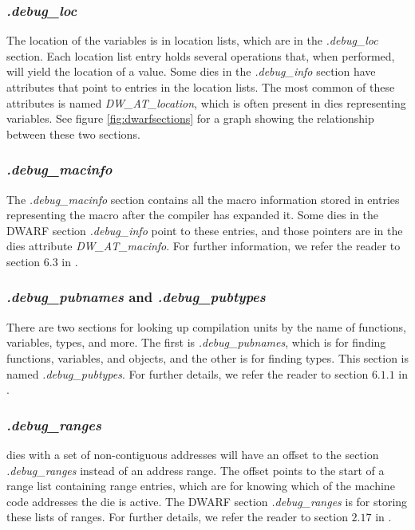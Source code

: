 \subsubsection{\emph{.debug\_loc}}
The location of the variables is in location lists, which are in the \emph{.debug\_loc} section.
Each location list entry holds several operations that, when performed, will yield the location of a value.
Some \glspl{die} in the \emph{.debug\_info} section have attributes that point to entries in the location lists.
The most common of these attributes is named \emph{DW\_AT\_location}, which is often present in \glspl{die} representing variables.
See figure \ref{fig:dwarfsections} for a graph showing the relationship between these two sections.


\subsubsection{\emph{.debug\_macinfo}}
The \emph{.debug\_macinfo} section contains all the macro information stored in entries representing the macro after the compiler has expanded it.
Some \glspl{die} in the \gls{DWARF} section \emph{.debug\_info} point to these entries, and those pointers are in the \glspl{die} attribute \emph{DW\_AT\_macinfo}.
For further information, we refer the reader to section $6.3$ in \cite{dwarf}.


\subsubsection{\emph{.debug\_pubnames} and \emph{.debug\_pubtypes}}
There are two sections for looking up compilation units by the name of functions, variables, types, and more.
The first is \emph{.debug\_pubnames}, which is for finding functions, variables, and objects, and the other is for finding types.
This section is named \emph{.debug\_pubtypes}.
For further details, we refer the reader to section $6.1.1$ in \cite{dwarf}.


\subsubsection{\emph{.debug\_ranges}}
\glspl{die} with a set of non-contiguous addresses will have an offset to the section \emph{.debug\_ranges} instead of an address range.
The offset points to the start of a range list containing range entries, which are for knowing which of the machine code addresses the \gls{die} is active.
The \gls{DWARF} section \emph{.debug\_ranges} is for storing these lists of ranges.
For further details, we refer the reader to section $2.17$ in \cite{dwarf}.


